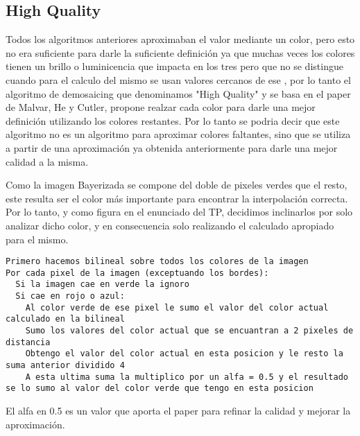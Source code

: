 \subsection{High Quality}

Todos los algoritmos anteriores aproximaban el valor mediante un color, pero esto no era suficiente para darle la suficiente definición ya que muchas veces los colores tienen un brillo o luminicencia que impacta en los tres pero que no se distingue cuando para el calculo del mismo se usan valores cercanos de ese , por lo tanto el algoritmo de demosaicing que denominamos "High Quality" y se basa en el paper de Malvar, He y Cutler, propone realzar cada color para darle una mejor definición utilizando los colores restantes. Por lo tanto se podria decir que este algoritmo no es un algoritmo para aproximar colores faltantes, sino que se utiliza a partir de una aproximación ya obtenida anteriormente para darle una mejor calidad a la misma.

Como la imagen Bayerizada se compone del doble de pixeles verdes que el resto, este resulta ser el color más importante para encontrar la interpolación correcta. Por lo tanto, y como figura en el enunciado del TP, decidimos inclinarlos por solo analizar dicho color, y en consecuencia solo realizando el calculado apropiado para el mismo.

\begin{lstlisting}[frame=single] 
Primero hacemos bilineal sobre todos los colores de la imagen
Por cada pixel de la imagen (exceptuando los bordes):
  Si la imagen cae en verde la ignoro 
  Si cae en rojo o azul:
    Al color verde de ese pixel le sumo el valor del color actual calculado en la bilineal
    Sumo los valores del color actual que se encuantran a 2 pixeles de distancia 
    Obtengo el valor del color actual en esta posicion y le resto la suma anterior dividido 4
    A esta ultima suma la multiplico por un alfa = 0.5 y el resultado se lo sumo al valor del color verde que tengo en esta posicion
\end{lstlisting}

El alfa en 0.5 es un valor que aporta el paper para refinar la calidad y mejorar la aproximación.